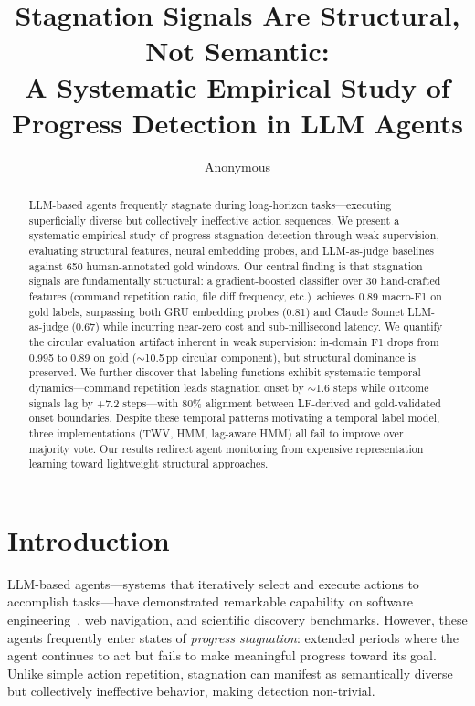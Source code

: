 \documentclass[11pt,a4paper]{article}
\title{Stagnation Signals Are Structural, Not Semantic:\\A Systematic Empirical Study of Progress Detection in LLM Agents}
\author{Anonymous}
\date{}
\begin{document}
\maketitle

\begin{abstract}
LLM-based agents frequently stagnate during long-horizon tasks---executing superficially diverse but collectively ineffective action sequences.
We present a systematic empirical study of progress stagnation detection through weak supervision, evaluating structural features, neural embedding probes, and LLM-as-judge baselines against 650 human-annotated gold windows.
Our central finding is that stagnation signals are fundamentally structural: a gradient-boosted classifier over 30 hand-crafted features (command repetition ratio, file diff frequency, etc.)\ achieves 0.89 macro-F1 on gold labels, surpassing both GRU embedding probes (0.81) and Claude Sonnet LLM-as-judge (0.67) while incurring near-zero cost and sub-millisecond latency.
We quantify the circular evaluation artifact inherent in weak supervision: in-domain F1 drops from 0.995 to 0.89 on gold ($\sim$10.5\,pp circular component), but structural dominance is preserved.
We further discover that labeling functions exhibit systematic temporal dynamics---command repetition leads stagnation onset by $\sim$1.6 steps while outcome signals lag by +7.2 steps---with 80\% alignment between LF-derived and gold-validated onset boundaries.
Despite these temporal patterns motivating a temporal label model, three implementations (TWV, HMM, lag-aware HMM) all fail to improve over majority vote.
Our results redirect agent monitoring from expensive representation learning toward lightweight structural approaches.
\end{abstract}

\section{Introduction}

LLM-based agents---systems that iteratively select and execute actions to accomplish tasks---have demonstrated remarkable capability on software engineering~\cite{yang2024swe}, web navigation, and scientific discovery benchmarks.
However, these agents frequently enter states of \emph{progress stagnation}: extended periods where the agent continues to act but fails to make meaningful progress toward its goal.
Unlike simple action repetition, stagnation can manifest as semantically diverse but collectively ineffective behavior, making detection non-trivial.
\end{document}
